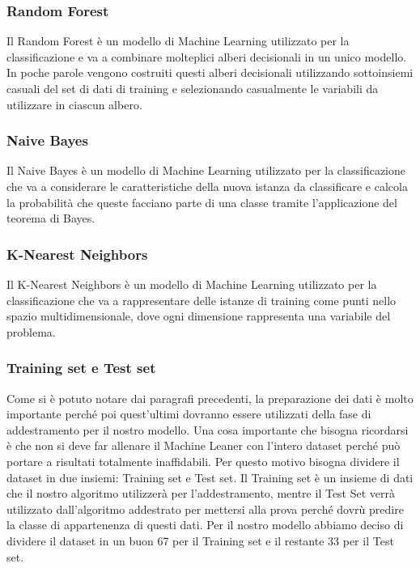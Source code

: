 \documentclass[12pt]{article}
\begin{document}
\subsubsection{Random Forest}
Il Random Forest è un modello di Machine Learning utilizzato per la classificazione e va a combinare molteplici alberi decisionali in un unico modello. In poche parole vengono costruiti questi alberi
decisionali utilizzando sottoinsiemi casuali del set di dati di training e selezionando casualmente le variabili da utilizzare in ciascun albero.

\subsubsection{Naive Bayes}
Il Naive Bayes è un modello di Machine Learning utilizzato per la classificazione che va a considerare le caratteristiche della nuova istanza da classificare e calcola la probabilità che queste facciano parte di una classe
tramite l'applicazione del teorema di Bayes.

\subsubsection{K-Nearest Neighbors}
Il K-Nearest Neighbors è un modello di Machine Learning utilizzato per la classificazione che va a rappresentare delle istanze di training come punti nello spazio multidimensionale, dove ogni dimensione
rappresenta una variabile del problema.

\subsubsection{Training set e Test set}
Come si è potuto notare dai paragrafi precedenti, la preparazione dei dati è molto importante perché poi quest'ultimi dovranno essere utilizzati della fase di addestramento per il nostro modello. Una cosa importante che bisogna ricordarsi è che non si deve far allenare il Machine Leaner con
l'intero dataset perché può portare a risultati totalmente inaffidabili. Per questo motivo bisogna dividere il dataset  in due insiemi: Training set e Test set. Il Training set è un insieme di dati che il nostro algoritmo utilizzerà per l'addestramento, mentre il Test Set verrà utilizzato dall'algoritmo
addestrato per mettersi alla prova perché dovrù predire la classe di appartenenza di questi dati.
Per il nostro modello abbiamo deciso di dividere il dataset in un buon 67 per il Training set e il restante 33 per il Test set.
\end{document}
